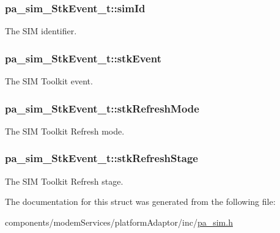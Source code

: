 \subsubsection[{\texorpdfstring{sim\+Id}{simId}}]{ pa\+\_\+sim\+\_\+\+Stk\+Event\+\_\+t\+::sim\+Id}\hypertarget{structpa__sim___stk_event__t_ab0eb2008b8bbf7c8c0cd5ad537374246}{}\label{structpa__sim___stk_event__t_ab0eb2008b8bbf7c8c0cd5ad537374246}


The S\+IM identifier. 

\subsubsection[{\texorpdfstring{stk\+Event}{stkEvent}}]{ pa\+\_\+sim\+\_\+\+Stk\+Event\+\_\+t\+::stk\+Event}\hypertarget{structpa__sim___stk_event__t_a88ef10583b8c8a008665548c3bd6b31c}{}\label{structpa__sim___stk_event__t_a88ef10583b8c8a008665548c3bd6b31c}


The S\+IM Toolkit event. 

\subsubsection[{\texorpdfstring{stk\+Refresh\+Mode}{stkRefreshMode}}]{ pa\+\_\+sim\+\_\+\+Stk\+Event\+\_\+t\+::stk\+Refresh\+Mode}\hypertarget{structpa__sim___stk_event__t_a395ef063318c0ff0b89837189149891f}{}\label{structpa__sim___stk_event__t_a395ef063318c0ff0b89837189149891f}


The S\+IM Toolkit Refresh mode. 

\subsubsection[{\texorpdfstring{stk\+Refresh\+Stage}{stkRefreshStage}}]{ pa\+\_\+sim\+\_\+\+Stk\+Event\+\_\+t\+::stk\+Refresh\+Stage}\hypertarget{structpa__sim___stk_event__t_aaab2fdc9d85ea43b09869b0708c11f4a}{}\label{structpa__sim___stk_event__t_aaab2fdc9d85ea43b09869b0708c11f4a}


The S\+IM Toolkit Refresh stage. 



The documentation for this struct was generated from the following file\+:\begin{DoxyCompactItemize}
\item 
components/modem\+Services/platform\+Adaptor/inc/\hyperlink{pa__sim_8h}{pa\+\_\+sim.\+h}\end{DoxyCompactItemize}
